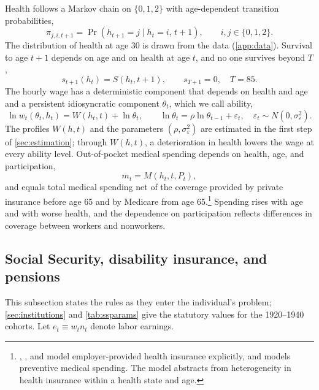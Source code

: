 Health follows a Markov chain on $\{0,1,2\}$ with age-dependent transition probabilities,
\begin{equation}\label{eq:health}
\pi_{j,i,t+1}=\Pr\left(h_{t+1}=j\mid h_t=i,\,t+1\right),\qquad i,j\in\{0,1,2\}.
\end{equation}
The distribution of health at age 30 is drawn from the data (\autoref{app:data}). %
Survival to age $t+1$ depends on age and on health at age $t$, and no one survives beyond $T$,
\begin{equation}\label{eq:survival}
s_{t+1}(h_t)=S(h_t,t+1),\qquad s_{T+1}=0,\quad T=85.
\end{equation}
The hourly wage has a deterministic component that depends on health and age and a persistent idiosyncratic component $\theta_t$, which we call ability,
\begin{equation}\label{eq:wage}
\ln w_t(\theta_t,h_t)=W(h_t,t)+\ln\theta_t,\qquad
\ln\theta_t=\rho\ln\theta_{t-1}+\varepsilon_t,\quad \varepsilon_t\sim N(0,\sigma_\varepsilon^2).
\end{equation}
The profiles $W(h,t)$ and the parameters $(\rho,\sigma_\varepsilon^2)$ are estimated in the first step of \autoref{sec:estimation}; through $W(h,t)$, a deterioration in health lowers the wage at every ability level. %
Out-of-pocket medical spending depends on health, age, and participation,
\begin{equation}\label{eq:oop}
m_t=M(h_t,t,P_t),
\end{equation}
and equals total medical spending net of the coverage provided by private insurance before age 65 and by Medicare from age 65.\footnote{\citet{Blau2008b}, \citet{Imrohoroglu2012}, and \citet{french2011effects} model employer-provided health insurance explicitly, and \citet{ozkan2023preventive} models preventive medical spending. The model abstracts from heterogeneity in health insurance within a health state and age.} %
Spending rises with age and with worse health, and the dependence on participation reflects differences in coverage between workers and nonworkers. %

\subsection{Social Security, disability insurance, and pensions}\label{subsec:programs}

This subsection states the rules as they enter the individual's problem; \autoref{sec:institutions} and \autoref{tab:ssparams} give the statutory values for the 1920--1940 cohorts. Let $e_t\equiv w_t n_t$ denote labor earnings. %

